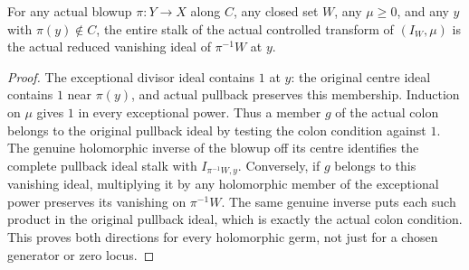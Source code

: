 \begin{lemma}
\label{hir:controlled-hypersurface-off-centre-stalk}
\leanok
For any actual blowup $\pi:Y\to X$ along $C$, any closed set $W$, any
$\mu\ge0$, and any $y$ with $\pi(y)\notin C$, the entire stalk of
the actual controlled transform of $(I_W,\mu)$ is the actual reduced
vanishing ideal of $\pi^{-1}W$ at $y$.
\end{lemma}
\begin{proof}
The exceptional divisor ideal contains $1$ at $y$: the original centre
ideal contains $1$ near $\pi(y)$, and actual pullback preserves this
membership.  Induction on $\mu$ gives $1$ in every exceptional power.
Thus a member $g$ of the actual colon belongs to the original pullback
ideal by testing the colon condition against $1$.
The genuine holomorphic inverse of the blowup off its centre identifies
the complete pullback ideal stalk with $I_{\pi^{-1}W,y}$.
Conversely, if $g$ belongs to this vanishing ideal, multiplying it by
any holomorphic member of the exceptional power preserves its vanishing
on $\pi^{-1}W$.  The same genuine inverse puts each such product in
the original pullback ideal, which is exactly the actual colon condition.
This proves both directions for every holomorphic germ, not just for a
chosen generator or zero locus.
\end{proof}

